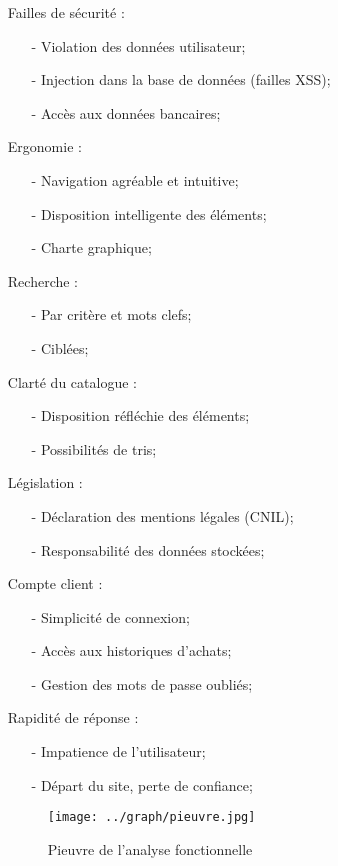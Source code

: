 \documentclass[a4paper]{article}
\begin{document}
	\begin{itemize}
		\item[]{Failles de sécurité :}
			\begin{itemize}
				\item[-] Violation des données utilisateur;
				\item[-] Injection dans la base de données (failles XSS);
				\item[-] Accès aux données bancaires;  
			\end{itemize}
		\item[]{Ergonomie :}
			\begin{itemize}
				\item[-] Navigation agréable et intuitive;
				\item[-] Disposition intelligente des éléments;
				\item[-] Charte graphique;
			\end{itemize}
		\item[]{Recherche : }
			\begin{itemize}
				\item[-] Par critère et mots clefs;
				\item[-] Ciblées;
			\end{itemize}
		\item[]{Clarté du catalogue :}
			\begin{itemize}
				\item[-] Disposition réfléchie des éléments;
				\item[-] Possibilités de tris;
			\end{itemize}
		\item[]{Législation :}
			\begin{itemize}
				\item[-] Déclaration des mentions légales (CNIL);
				\item[-] Responsabilité des données stockées;
			\end{itemize}
		\item[]{Compte client :}
			\begin{itemize}
				\item[-] Simplicité de connexion;
				\item[-] Accès aux historiques d'achats;
				\item[-] Gestion des mots de passe oubliés;
			\end{itemize}
		\item[]{Rapidité de réponse :}
			\begin{itemize}
				\item[-] Impatience de l'utilisateur;
				\item[-] Départ du site, perte de confiance; 
			\end{itemize}
	\newpage
	\begin{figure}[h]
		\centering
			\texttt{[image: ../graph/pieuvre.jpg]}
			\caption{Pieuvre de l'analyse fonctionnelle}
	\end{figure}
	\end{itemize}
\end{document}
